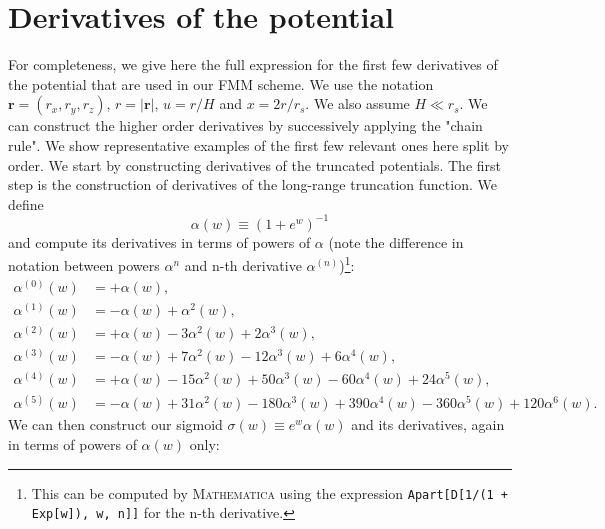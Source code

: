 \section{Derivatives of the potential}
\label{sec:pot_derivatives}

For completeness, we give here the full expression for the first few
derivatives of the potential that are used in our FMM scheme. We use
the notation $\mathbf{r}=(r_x, r_y, r_z)$, $r = |\mathbf{r}|$, $u=r/H$
and $x=2r/r_s$. We also assume $H \ll r_s$. We can construct the
higher order derivatives by successively applying the "chain rule". We
show representative examples of the first few relevant ones here split
by order. We start by constructing derivatives of the truncated
potentials. The first step is the construction of derivatives of the
long-range truncation function. We define
\begin{equation}
  \alpha(w) \equiv \left(1 + e^w\right)^{-1} \nonumber
\end{equation}
and compute its derivatives in terms of powers of $\alpha$ (note the
difference in notation between powers $\alpha^n$ and n-th derivative
$\alpha^{(n)}$)\footnote{This can be computed by \textsc{Mathematica}
  using the expression \texttt{Apart[D[1/(1 + Exp[w]), {w, n}]]} for
  the n-th derivative.}:
\begin{align}
  \alpha^{(0)}(w) &= +\alpha(w), \nonumber\\
  \alpha^{(1)}(w) &= -\alpha(w) + \alpha^2(w),  \nonumber\\
  \alpha^{(2)}(w) &= +\alpha(w) - 3\alpha^2(w) + 2\alpha^3(w),  \nonumber\\
  \alpha^{(3)}(w) &= -\alpha(w) + 7\alpha^2(w) - 12\alpha^3(w) + 6\alpha^4(w),   \nonumber\\
  \alpha^{(4)}(w) &= +\alpha(w) - 15\alpha^2(w) + 50\alpha^3(w) - 60\alpha^4(w) + 24\alpha^5(w),    \nonumber\\
  \alpha^{(5)}(w) &= -\alpha(w) + 31\alpha^2(w) -180\alpha^3(w) + 390\alpha^4(w) -360\alpha^5(w) + 120\alpha^6(w).\nonumber                                      
\end{align}
We can then construct our sigmoid $\sigma(w) \equiv e^w\alpha(w)$ and
its derivatives, again in terms of powers of $\alpha(w)$ only:

